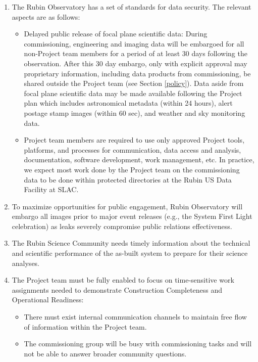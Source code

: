 \documentclass[SE,authoryear,toc]{lsstdoc}
\begin{document}
\begin{enumerate}

  \item The Rubin Observatory has a set of standards for data security.
  The relevant aspects are as follows:

  \begin{itemize}

    \item Delayed public release of focal plane scientific data:
    During commissioning, engineering and imaging data will be embargoed for all non-Project team members for a period of at least 30 days following the observation.
    After this 30 day embargo, only with explicit approval may proprietary information, including data products from commissioning, be shared outside the Project team (see Section \ref{policy}).
    Data aside from focal plane scientific data may be made available following the Project plan which includes astronomical metadata (within 24 hours), alert postage stamp images (within 60 sec), and weather and sky monitoring data.

    \item Project team members are required to use only approved Project tools, platforms, and processes for communication, data access and analysis, documentation, software development, work management, etc.
    In practice, we expect most work done by the Project team on the commissioning data to be done within protected directories at the Rubin US Data Facility at SLAC.

  \end{itemize}

  \item To maximize opportunities for public engagement, Rubin Observatory will embargo all images prior to major event releases (e.g., the System First Light celebration) as leaks severely compromise public relations effectiveness.

  \item The Rubin Science Community needs timely information about the technical and scientific performance of the as-built system to prepare for their science analyses.

  \item The Project team must be fully enabled to focus on time-sensitive work assignments needed to demonstrate Construction Completeness and Operational Readiness:

  \begin{itemize}

    \item There must exist internal communication channels to maintain free flow of information within the Project team.

    \item The commissioning group will be busy with commissioning tasks and will not be able to answer broader community questions.

  \end{itemize}

\end{enumerate}
\end{document}
